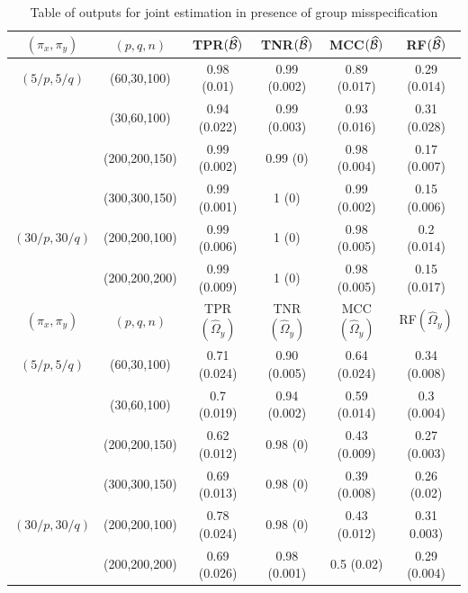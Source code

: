 \begin{scriptsize}
\begin{table}[t!]
\centering
    \begin{tabular}{cccccc}
    \hline
    $(\pi_x, \pi_y)$ & $(p,q,n)$   & TPR$(\widehat {{\cal{B}}})$            & TNR$(\widehat {{\cal{B}}})$             & MCC$(\widehat {{\cal{B}}})$ & RF$(\widehat {{\cal{B}}})$    \\ \hline
    $(5/p, 5/q)$   & (60,30,100)   & 0.98 (0.01)   & 0.99 (0.002)   & 0.89 (0.017)  & 0.29 (0.014) \\
    ~              & (30,60,100)   & 0.94 (0.022)  & 0.99 (0.003)   & 0.93 (0.016)  & 0.31 (0.028) \\
    ~              & (200,200,150) & 0.99 (0.002)  & 0.99 (0)       & 0.98 (0.004)  & 0.17 (0.007) \\
    ~              & (300,300,150) & 0.99 (0.001)  & 1 (0)          & 0.99 (0.002)  & 0.15 (0.006) \\
    $(30/p, 30/q)$ & (200,200,100) & 0.99 (0.006)  & 1 (0)          & 0.98 (0.005)  & 0.2 (0.014)  \\
    ~              & (200,200,200) & 0.99 (0.009)  & 1 (0)          & 0.98 (0.005)  & 0.15 (0.017) \\\hline
    \hline
    $(\pi_x, \pi_y)$ & $(p,q,n)$   & TPR$(\widehat \Omega_y)$            & TNR$(\widehat \Omega_y)$             & MCC$(\widehat \Omega_y)$ & RF$(\widehat \Omega_y)$            \\ \hline
    $(5/p, 5/q)$   & (60,30,100)   & 0.71 (0.024)  & 0.90 (0.005)   & 0.64 (0.024)  & 0.34 (0.008)\\
    ~              & (30,60,100)   & 0.7 (0.019)   & 0.94 (0.002)   & 0.59 (0.014)  & 0.3 (0.004) \\
    ~              & (200,200,150) & 0.62 (0.012)  & 0.98 (0)       & 0.43 (0.009)  & 0.27 (0.003)\\
    ~              & (300,300,150) & 0.69 (0.013)  & 0.98 (0)       & 0.39 (0.008)  & 0.26 (0.02) \\
    $(30/p, 30/q)$ & (200,200,100) & 0.78 (0.024)  & 0.98 (0)       & 0.43 (0.012)  & 0.31 0.003) \\
    ~              & (200,200,200) & 0.69 (0.026)  & 0.98 (0.001)   & 0.5 (0.02)    & 0.29 (0.004)\\\hline
    \end{tabular}
    \caption{Table of outputs for joint estimation in presence of group misspecification}
    \label{table:simtable2}
\end{table}
\end{scriptsize}

